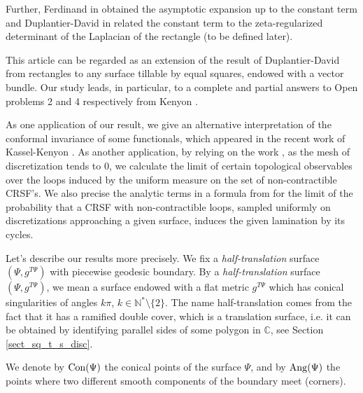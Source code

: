 \documentclass[12pt]{article}
\numberwithin{equation}{section}
\theoremstyle{theorem}
\theoremstyle{definition}
\theoremstyle{remark}
\newcommand{\comp}{\mathbb{C}}
\newcommand{\nat}{\mathbb{N}}
\begin{document}
	Further, Ferdinand in \cite{Ferdin1967} obtained the asymptotic expansion up to the constant term and Duplantier-David in \cite{DuplDav} related the constant term to the zeta-regularized determinant of the Laplacian of the rectangle (to be defined later).

	\par 
	This article can be regarded as an extension of the result of Duplantier-David from rectangles to any surface tillable by equal squares, endowed with a vector bundle. Our study leads, in particular, to a complete and partial answers to Open problems 2 and 4 respectively from Kenyon \cite[\S 8]{KenyonDet}.
	\par 
	As one application of our result, we give an alternative interpretation of the conformal invariance of some functionals, which appeared in the recent work of Kassel-Kenyon \cite{KassKenyon}.
	As another application, by relying on the work \cite{KassKenyon}, as the mesh of discretization tends to $0$, we calculate the limit of certain topological observables over the loops induced by the uniform measure on the set of non-contractible CRSF's.
	We also precise the analytic terms in a formula from \cite{KassKenyon} for the limit of the probability that a CRSF with non-contractible loops, sampled uniformly on discretizations approaching a given surface, induces the given lamination by its cycles.
	\par 
	Let's describe our results more precisely.
	We fix a \textit{half-translation} surface $(\Psi, g^{T \Psi})$ with piecewise geodesic boundary.
	By a \textit{half-translation} surface $(\Psi, g^{T \Psi})$, we mean a surface endowed with a flat metric $g^{T \Psi}$ which has conical singularities of angles $k \pi$, $k \in \nat^* \setminus \{2\}$. The name half-translation comes from the fact that it has a ramified double cover, which is a translation surface, i.e. it can be obtained by identifying parallel sides of some polygon in $\comp$, see Section \ref{sect_sq_t_s_disc}.
	\par
	We denote by ${\rm{Con}}(\Psi)$ the conical points of the surface $\Psi$, and by ${\rm{Ang}}(\Psi)$ the points where two different smooth components of the boundary meet (corners). 
\end{document}
